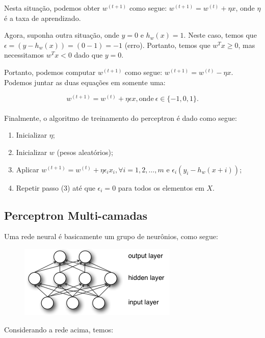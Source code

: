 Nesta situação, podemos obter $w^{(t + 1)}$ como segue: $w^{(t + 1)} = w^{(t)} + \eta x$, onde $\eta$ é a taxa de aprendizado.

Agora, suponha outra situação, onde $y = 0$ e $h_w(x) = 1$. Neste caso, temos que $\epsilon = (y - h_w(x)) = (0 - 1) = -1$ (erro). Portanto, temos que $w^Tx \geq 0$, mas necessitamos $w^Tx < 0$ dado que $y = 0$.

Portanto, podemos computar $w^{(t + 1)}$ como segue: $w^{(t + 1)} = w^{(t)} - \eta x$. Podemos juntar as duas equações em somente uma:

\begin{equation}
w^{(t + 1)} = w^{(t)} + \eta \epsilon x, \text{onde} \ \epsilon \in \{-1, 0, 1\}.
\end{equation}\\

Finalmente, o algoritmo de treinamento do perceptron é dado como segue:

\begin{enumerate}
\item Inicializar $\eta$;
\item Inicializar $w$ (pesos aleatórios);
\item Aplicar $w^{(t + 1)} = w^{(t)} + \eta \epsilon_i x_i, \forall i = 1, 2, \dots, m$ e $\epsilon_i(y_i - h_w(x+i))$;
\item Repetir passo (3) até que $\epsilon_i = 0$ para todos os elementos em $X$.
\end{enumerate}

\subsection{Perceptron Multi-camadas}
\label{ss.multi_perceptron}

Uma rede neural é basicamente um grupo de neurônios, como segue:

\begin{figure}[!h]
\centering
\includegraphics[scale=0.75]{figs/mlp.png}
\label{f.mlp}
\end{figure}

Considerando a rede acima, temos:

